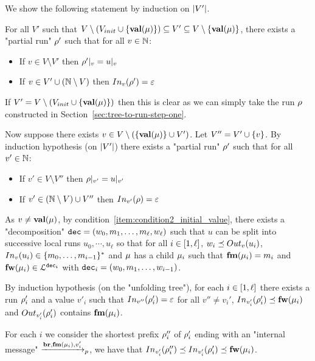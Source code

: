 	We show the following statement by induction on $\size{V'}$.
	
	For all $V'$ such that $V \setminus (V_{init} \cup \set{\valuelabel{\node}}) \subseteq V' \subseteq V \setminus \set{\valuelabel{\node}}$, there exists a "partial run" $\run'$ such that for all $v \in \nats$:
	\begin{itemize}		
		\item If $v \in V \setminus V'$ then $\vproj{v}{\run'} = \vproj{v}{u}$
		
		\item If $v \in V' \cup (\nats \setminus V)$ then $\vinput{v}{\run'} = \epsilon$
	\end{itemize}  

If $V' = V \setminus (V_{init} \cup \set{\valuelabel{\node}})$ then this is clear as we can simply take the run $\run$ constructed in Section~\ref{sec:tree-to-run-step-one}.

Now suppose there exists $v \in V \setminus (\set{\valuelabel{\node}} \cup V')$. Let $V'' = V' \cup \set{v}$. By induction hypothesis (on $\size{V'}$) there exists a "partial run" $\run'$ such that for all $v' \in \nats$:
\begin{itemize}
	\item If $v' \in V \setminus V''$ then $\vproj{v'}{\run} = \vproj{v'}{u}$
	
	\item If $v' \in (\nats \setminus V) \cup V''$ then $\vinput{v'}{\run} = \epsilon$
\end{itemize}

As $v \neq \valuelabel{\node}$, by condition~\ref{item:condition2_initial_value}, there exists a "decomposition" $\decsymb = (w_0, m_1, \ldots, m_\ell, w_\ell)$ such that $u$ can be split into successive local runs $u_0, \cdots, u_\ell$ so that for all $i \in \nset{1}{\ell}$, $w_i \subword \voutput{v}{u_i}$, $\vinput{v}{u_i} \in \set{m_0, \ldots, m_{i-1}}^*$ and $\node$ has a child $\node_i$ such that $\followlabelmessage{\mu_i} = m_i$ and $\followlabelword{\node_i} \in \langdec{\decsymb_i}$ with $\decsymb_i = (w_0, m_1, \ldots, w_{i-1})$.

By induction hypothesis (on the "unfolding tree"), for each $i \in\nset{1}{\ell}$ there exists a run $\run'_i$ and a value $v'_i$ such that $\vinput{v''}{\run'_i} = \epsilon$ for all $v'' \neq v_i'$, $\vinput{v'_i}{\run'_i} \subword \followlabelword{\node_i}$ and $\voutput{v'_i}{\run'_i}$ contains $\followlabelmessage{\node_i}$.

For each $i$ we consider the shortest prefix $\run''_i$ of $\run'_i$ ending with an "internal message" $\intmessage{\followlabelmessage{\node_i}}{v'_i}$, we have that $\vinput{v'_i}{\run''_i} \subword \vinput{v'_i}{\run'_i} \subword \followlabelword{\node_i}$.

